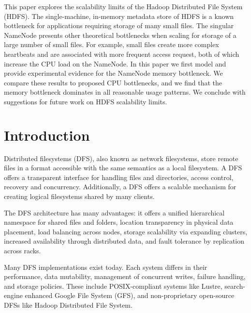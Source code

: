 \documentclass[11pt, a4paper]{article}
\author{\theauthor}
\title{\thetitle}
\date{\duedate}
\renewenvironment{abstract}
 {\small
  \begin{center}
  \bfseries \abstractname\vspace{-.5em}\vspace{0pt}
  \end{center}
  \list{}{%
    \setlength{\leftmargin}{0mm}%
    \setlength{\rightmargin}{\leftmargin}%
  }%
  \item\relax}
 {\endlist}
\begin{document}
\maketitle
\thispagestyle{empty}
\begin{multicols*}{2}
\begin{abstract}
    This paper explores the scalability limits of the Hadoop Distributed File System (HDFS). The single-machine, in-memory metadata store of HDFS is a known bottleneck for applications requiring storage of many small files. The singular NameNode presents other theoretical bottlenecks when scaling for storage of a large number of small files. For example, small files create more complex heartbeats and are associated with more frequent access request, both of which increase the CPU load on the NameNode. In this paper we first model and provide experimental evidence for the NameNode memory bottleneck. We compare these results to proposed CPU bottlenecks, and we find that the memory bottleneck dominates in all reasonable usage patterns. We conclude with suggestions for future work on HDFS scalability limits.
\end{abstract}

\section{Introduction}

Distributed filesystems (DFS), also known as network filesystems, store remote files in a format accessible with the same semantics as a local filesystem. A DFS offers a transparent interface for handling files and directories, access control, recovery and concurrency. Additionally, a DFS offers a scalable mechanism for creating logical filesystems shared by many clients.

The DFS architecture has many advantages: it offers a unified hierarchical namespace for shared files and folders, location transparency in physical data placement, load balancing across nodes, storage scalability via expanding clusters, increased availability through distributed data, and fault tolerance by replication across racks.

Many DFS implementations exist today. Each system differs in their performance, data mutability, management of concurrent writes, failure handling, and storage policies. These include POSIX-compliant systems like Lustre, search-engine enhanced Google File System (GFS), and non-proprietary open-source DFSs like Hadoop Distributed File System.


\end{multicols*}
\end{document}
